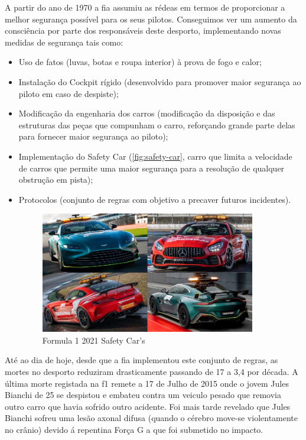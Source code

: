 \documentclass{report}
\begin{document}
A partir do ano de 1970 a \ac{fia} assumiu as rédeas em termos de proporcionar a melhor segurança possível para os seus pilotos. Conseguimos ver um aumento da consciência por parte dos responsáveis deste desporto, implementando novas medidas de segurança tais como:
\begin{itemize}
\item Uso de fatos (luvas, botas e roupa interior) à prova de fogo e calor;
\item Instalação do Cockpit rígido (desenvolvido para promover maior segurança ao piloto em caso de despiste);
\item Modificação da engenharia dos carros (modificação da disposição e das estruturas das peças que compunham o carro, reforçando grande parte delas para fornecer maior segurança ao piloto);
\item Implementação do Safety Car (\autoref{fig:safety-car}, carro que limita a velocidade de carros que permite uma maior segurança para a resolução de qualquer obstrução em pista);
\item Protocolos (conjunto de regras com objetivo a precaver futuros incidentes). 
\begin{figure}[h]
\center %
\includegraphics[height=150pt]{safety-car}
\caption{Formula 1 2021 Safety Car's}
\label{fig:safety-car}
\end{figure}

\end{itemize}

Até ao dia de hoje, desde que a \ac{fia} implementou este conjunto de regras, as mortes no desporto reduziram drasticamente passando de 17 a 3,4 por década. A última morte registada na \ac{f1} remete a 17 de Julho de 2015 onde o jovem Jules Bianchi de 25 se despistou e embateu contra um veiculo pesado que removia outro carro que havia sofrido outro acidente. Foi mais tarde revelado que Jules Bianchi sofreu uma lesão axonal difusa (quando o cérebro move-se violentamente no crânio) devido á repentina Força G a que foi submetido no impacto.
\end{document}
